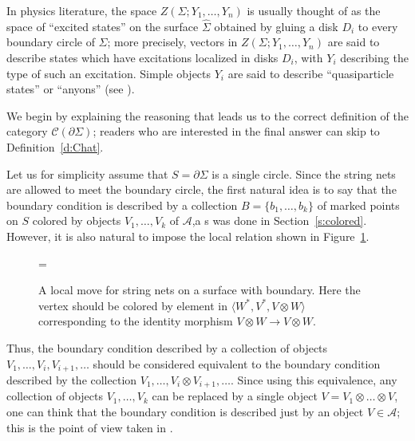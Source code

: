\documentclass{amsart}
\theoremstyle{definition}
\theoremstyle{remark}
\numberwithin{equation}{section}
\newcommand{\firef}[1]{Figure~{\rm\ref{#1}}}
\newcommand{\deref}[1]{Definition~{\rm\ref{#1}}}
\newcommand{\seref}[1]{Section~{\rm\ref{#1}}}
\newcommand{\del}{\partial}
\newcommand{\<}{\langle}
\renewcommand{\>}{\rangle}
\newcommand{\C}{\mathcal{C}}      %
\newcommand{\A}{\mathcal{A}}      %
\newcommand{\Si}{\Sigma}
\begin{document}
In physics literature, the space $Z(\Si; Y_1,\dots, Y_n)$  is usually 
thought of as  the space of ``excited states'' on the surface $\hat\Si$ 
obtained by gluing a disk $D_i$ to every boundary 
circle of $\Si$; more precisely, vectors in $Z(\Si; Y_1,\dots, Y_n)$ are 
said to describe states which have excitations localized in disks $D_i$, 
with $Y_i$ describing the type of such an excitation.
Simple objects $Y_i$ are said to describe ``quasiparticle states'' or 
``anyons'' (see ). 

We begin by explaining the reasoning that leads us to the correct 
definition of the category $\C(\del \Si)$; readers who are interested in 
the final answer can skip to \deref{d:Chat}.

Let us for simplicity assume that $S=\del \Si$ is a single circle. Since 
the string nets are allowed to meet the boundary circle, the first natural 
idea is to say that the boundary condition  is described by a collection 
$B=\{b_1,\dots, b_k\}$ of marked points on $S$  colored by objects 
$V_1,\dots, V_k$ of $\A$,a s was done in \seref{s:colored}.  However, it is
also natural to impose the local relation shown in
\firef{f:boundary_move}. 
\begin{figure}[ht]
=
  \caption{A local move for string nets on a surface with boundary. Here  
    the vertex should be colored by element in $\<W^*,V^*, V\otimes W\>$ 
    corresponding to the identity morphism $V\otimes W\to V\otimes W$.}
  \label{f:boundary_move}
\end{figure}

Thus, the boundary condition described by a collection of objects $V_1, 
\dots, V_i, V_{i+1},\dots$ should be considered equivalent to the boundary 
condition described by the collection  $V_1, \dots, V_{i}\otimes V_{i+1}, 
\dots$.  Since using this equivalence, any collection of 
objects $V_1,\dots, V_k$ can be replaced by a single object $V=V_1\otimes
\dots \otimes V$, one can think that the boundary condition is described 
just by an object $V\in \A$; this is the point of view taken in
.
\end{document}
